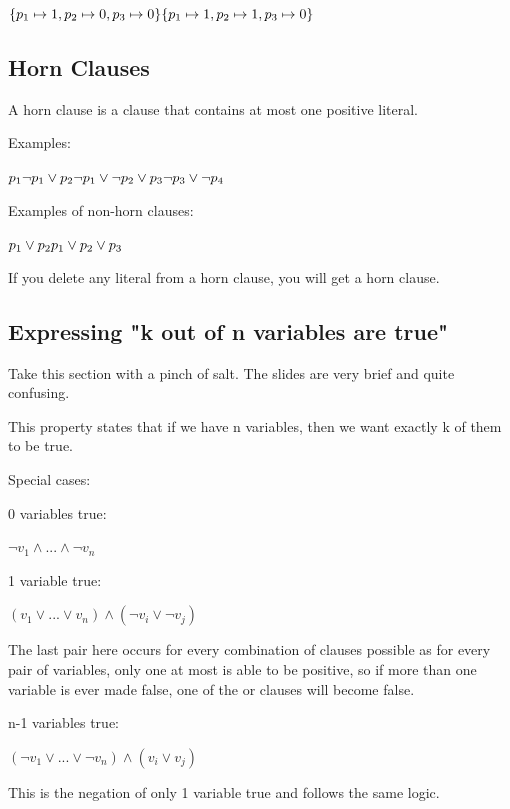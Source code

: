 \documentclass[11pt,a4paper]{article}
\begin{document}
$\{ p_1 \mapsto 1, p_2 \mapsto 0, p_3 \mapsto 0\} \\ \{ p_1 \mapsto 1, p_2 \mapsto 1, p_3 \mapsto 0\}$

\subsection{Horn Clauses}

A horn clause is a clause that contains at most one positive literal.

Examples:

$p_1 \\ \neg p_1 \vee p_2 \\ \neg p_1 \vee \neg p_2 \vee p_3 \\ \neg p_3 \vee \neg p_4$

Examples of non-horn clauses:

$p_1 \vee p_2 \\ p_1 \vee p_2 \vee p_3 $

If you delete any literal from a horn clause, you will get a horn clause.

\subsection{Expressing "k out of n variables are true"}

Take this section with a pinch of salt. The slides are very brief and quite confusing.

This property states that if we have n variables, then we want exactly k of them to be true.

Special cases:

0 variables true:

$\neg v_1 \wedge ... \wedge \neg v_n$

\vspace{5pt}
1 variable true:

$(v_1 \vee ... \vee v_n) \wedge (\neg v_i \vee \neg v_j)$

The last pair here occurs for every combination of clauses possible as for every pair of variables, only one at most is able to be positive, so if more than one variable is ever made false, one of the or clauses will become false.

\vspace{5pt}
n-1 variables true:

$(\neg v_1 \vee ... \vee \neg v_n) \wedge (v_i \vee v_j)$

This is the negation of only 1 variable true and follows the same logic.
\end{document}
